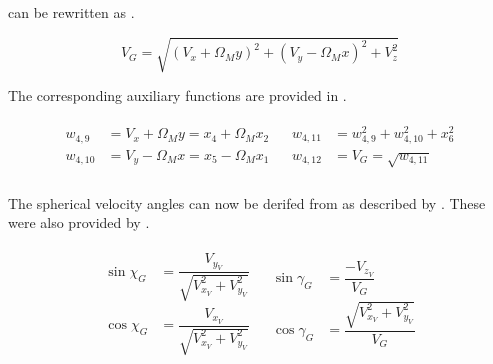 \noindent
{} can be rewritten as .

\begin{equation}\label{eq:xfifteen}
V_{G} = \sqrt{\left(V_{x}+\Omega_{M}y\right)^{2}+\left(V_{y}-\Omega_{M}x\right)^{2}+V_{z}^{2}} 
\end{equation}

\noindent
The corresponding auxiliary functions are provided in .

\begin{align} \label{eq:velocityAuxF}
\begin{split}
w_{4,9} &= V_{x}+\Omega_{M}y = x_{4}+\Omega_{M}x_{2} \\
w_{4,10} &= V_{y}-\Omega_{M}x = x_{5}-\Omega_{M}x_{1} \\
\end{split}
&
\begin{split}
w_{4,11} &= w_{4,9}^{2}+w_{4,10}^{2}+x_{6}^{2} \\
w_{4,12} &= V_{G}=\sqrt{w_{4,11}} \\
\end{split} 
\end{align} 

 
\noindent 
The spherical velocity angles can now be derifed from  as described by . These were also provided by \cite{mooij1994motion}. 





\begin{align} \label{eq:velAngl}
\begin{split}
\sin \chi_{G} &= \dfrac{V_{y_{V}}}{\sqrt{V_{x_{V}}^{2}+V_{y_{V}}^{2}}} \\
\cos \chi_{G} &= \dfrac{V_{x_{V}}}{\sqrt{V_{x_{V}}^{2}+V_{y_{V}}^{2}}} \\
\end{split}
&
\begin{split}
\sin \gamma_{G} &= \dfrac{-V_{z_{V}}}{V_{G}}\\
\cos \gamma_{G} &= \dfrac{\sqrt{V_{x_{V}}^{2}+V_{y_{V}}^{2}}}{V_{G}}\\
\end{split} 
\end{align} 

